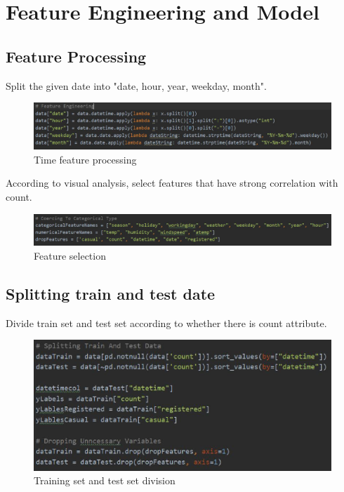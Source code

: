 \documentclass{amsart}
\begin{document}
\section{Feature Engineering and Model} \label{sec-method}
\subsection{Feature Processing}
Split the given date into "date, hour, year, weekday, month".
\begin{figure}[htbp]
	\includegraphics[scale=0.5]{./figure/1.eps}
	\caption{Time feature processing}
\end{figure}
According to visual analysis, select features that have strong correlation with count.
\begin{figure}[htbp]
	\includegraphics[scale=0.5]{./figure/2.eps}
	\caption{Feature selection}
\end{figure}

\subsection{Splitting train and test date}
Divide train set and test set according to whether there is count attribute.
\begin{figure}[htbp]
	\includegraphics[scale=0.6]{./figure/3.eps}
	\caption{Training set and test set division}
\end{figure}
\end{document}
